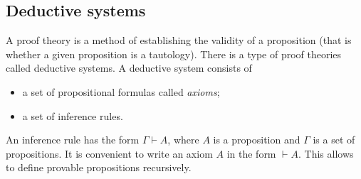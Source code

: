 \subsection{Deductive systems}
A proof theory is a method of establishing the validity of a proposition (that is whether a given proposition is a tautology).
There is a type of proof theories called deductive systems.
A deductive system consists of
\begin{itemize}
\item a set of propositional formulas called \emph{axioms};
\item a set of inference rules.
\end{itemize}

An inference rule has the form $\Gamma \vdash A$, where $A$ is a proposition and $\Gamma$ is a set of propositions.
It is convenient to write an axiom $A$ in the form $\vdash A$.
This allows to define provable propositions recursively.
